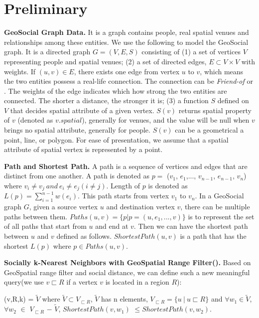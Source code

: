 \section{Preliminary}
\label{sec:preliminary}


{\bf GeoSocial Graph Data.} It is a graph contains people, real spatial venues and relationships among these entities. We use the following to model the GeoSocial graph. It is a directed graph $G=(V,E,S)$ consisting of (1) a set of vertices $V$ representing people and spatial venues; (2) a set of directed edges, $E\subset V\times V$ with weights. If $(u,v)\in E$, there exists one edge from vertex $u$ to $v$, which means the two entities possess a real-life connection. The connection can be {\em Friend-of} or {\Like}. The weights of the edge indicates which how strong the two entities are connected. The shorter a distance, the stronger it is; (3) a function $S$ defined on $V$ that decides spatial attribute of a given vertex. $S(v)$ returns spatial property of $v$ (denoted as $v.spatial$), generally for venues, and the value will be null when $v$ brings no spatial attribute, generally for people. $S(v)$ can be a geometrical a point, line, or polygon. For ease of presentation, we assume that a spatial attribute of spatial vertex is represented by a point.

\textbf{Path and Shortest Path.} A path is a sequence of vertices and edges that are distinct from one another. A path is denoted as $p =$ ($v_1$, $e_1$,..., $v_{n-1}$, $e_{n-1}$, $v_n$) where $v_i\neq v_j~and~e_i\neq e_j (i\neq j)$. Length of $p$ is denoted as $L(p) = \sum\limits_{i = 1}^{n-1}w(e_i)$. This path starts from vertex $v_1$ to $v_n$. In a GeoSocial graph $G$, given a source vertex $u$ and destination vertex $v$, there can be multiple paths between them. $Paths(u,v) = \{p|p = (u,e_1,..., v)\}$ is to represent the set of all paths that start from $u$ and end at $v$. Then we can have the shortest path between $u$ and $v$ defined as follows. $ShortestPath(u,v)$ is a path that has the shortest $L(p)$ where $p\in Paths(u,v)$.

\textbf{Socially k-Nearest Neighbors with GeoSpatial Range Filter({\query}).} Based on GeoSpatial range filter and social distance, we can define such a new meaningful query(we use $v\sqsubset R$ if a vertex $v$ is located in a region $R$):
\begin{defn}
	{\query}(v,R,k) = $\widetilde{V}$ where $\widetilde{V}\subset V_{\sqsubset R}$, $\widetilde{V}$ has n elements, $V_{\sqsubset R} = \{u~|~u\sqsubset R\}$ and $\forall w_1\in \widetilde{V}$, $\forall w_2$ $\in$ $V_{\sqsubset R}$ $-$ $\widetilde{V}$, $ShortestPath(v,w_1)$ $\leqslant ShortestPath(v,w_2)$.
\end{defn}

